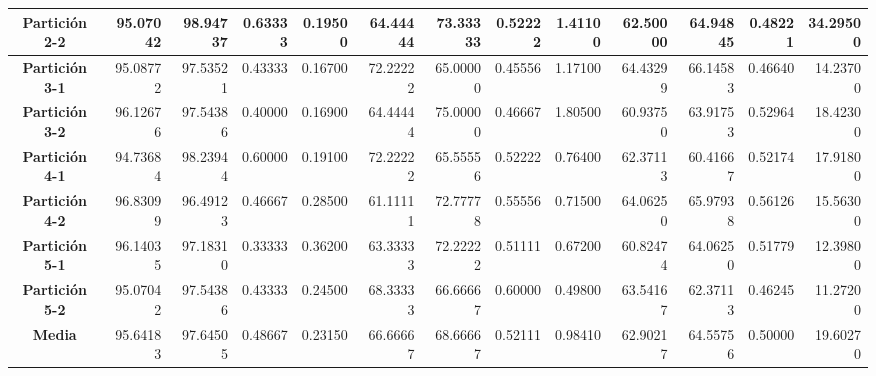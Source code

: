 \documentclass[a4paper,11pt]{article}
\begin{document}
\begin{table}[htbp]
\begin{adjustbox}{width=1.1\textwidth}
\begin{tabular}{|c|r|r|r|r|r|r|r|r|r|r|r|r|}
    \textbf{Partición 2-2} & 95.07042 & 98.94737 & 0.63333 & 0.19500 & 64.44444 & 73.33333 & 0.52222 & 1.41100 & 62.50000 & 64.94845 & 0.48221 & 34.29500 \\ \hline
    \textbf{Partición 3-1} & 95.08772 & 97.53521 & 0.43333 & 0.16700 & 72.22222 & 65.00000 & 0.45556 & 1.17100 & 64.43299 & 66.14583 & 0.46640 & 14.23700 \\ \hline
    \textbf{Partición 3-2} & 96.12676 & 97.54386 & 0.40000 & 0.16900 & 64.44444 & 75.00000 & 0.46667 & 1.80500 & 60.93750 & 63.91753 & 0.52964 & 18.42300 \\ \hline
    \textbf{Partición 4-1} & 94.73684 & 98.23944 & 0.60000 & 0.19100 & 72.22222 & 65.55556 & 0.52222 & 0.76400 & 62.37113 & 60.41667 & 0.52174 & 17.91800 \\ \hline
    \textbf{Partición 4-2} & 96.83099 & 96.49123 & 0.46667 & 0.28500 & 61.11111 & 72.77778 & 0.55556 & 0.71500 & 64.06250 & 65.97938 & 0.56126 & 15.56300 \\ \hline
    \textbf{Partición 5-1} & 96.14035 & 97.18310 & 0.33333 & 0.36200 & 63.33333 & 72.22222 & 0.51111 & 0.67200 & 60.82474 & 64.06250 & 0.51779 & 12.39800 \\ \hline
    \textbf{Partición 5-2} & 95.07042 & 97.54386 & 0.43333 & 0.24500 & 68.33333 & 66.66667 & 0.60000 & 0.49800 & 63.54167 & 62.37113 & 0.46245 & 11.27200 \\ \hline
    \textbf{Media} & 95.64183 & 97.64505 & 0.48667 & 0.23150 & 66.66667 & 68.66667 & 0.52111 & 0.98410 & 62.90217 & 64.55756 & 0.50000 & 19.60270 \\ \hline
    \end{tabular}
    \end{adjustbox}
    \label{BL}
  \end{table}  
\end{document}
